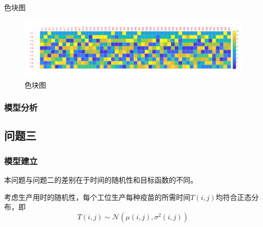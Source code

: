\documentclass[UTF8]{ctexart}
\begin{document}
\begin{enumerate}
	色块图
		\begin{figure}[H]
			\centering %
			\includegraphics[scale=0.5]{2_sekuai.jpg}
			\caption{色块图}
		\end{figure}
	\end{enumerate}
	
	\subsubsection{模型分析}
	
	\subsection{问题三}
	\subsubsection{模型建立}
	本问题与问题二的差别在于时间的随机性和目标函数的不同。
	\par 考虑生产用时的随机性，每个工位生产每种疫苗的所需时间$T(i,j)$均符合正态分布，即
	\begin{equation}
	T(i,j)\sim\mathcal{N}(\mu(i,j),\sigma^2(i,j))
	\end{equation}
	
\end{document}
